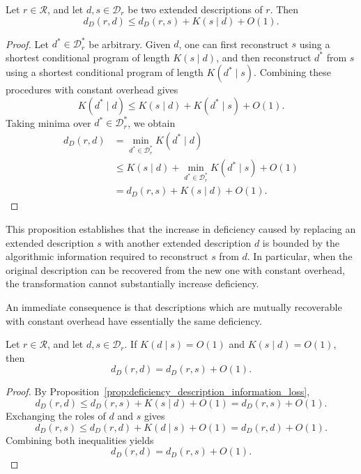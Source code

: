\begin{proposition}
\label{prop:deficiency_description_information_loss}
Let $r \in \mathcal R$, and let $d,s \in \mathcal D_r$ be two extended descriptions of $r$. Then
\[
d_D(r,d) \le d_D(r,s)+K(s\mid d)+O(1).
\]
\end{proposition}
\begin{proof}
Let $d^\ast \in \mathcal D_r^\ast$ be arbitrary. Given $d$, one can first reconstruct $s$ using a shortest conditional program of length $K(s\mid d)$, and then reconstruct $d^\ast$ from $s$ using a shortest conditional program of length $K(d^\ast\mid s)$. Combining these procedures with constant overhead gives
\[
K(d^\ast\mid d) \le K(s\mid d)+K(d^\ast\mid s)+O(1).
\]
Taking minima over $d^\ast \in \mathcal D_r^\ast$, we obtain
\[
\begin{aligned}
d_D(r,d)
& = \min_{d^\ast\in\mathcal D_r^\ast}K(d^\ast\mid d)\\
& \le K(s\mid d) + \min_{d^\ast\in\mathcal D_r^\ast}K(d^\ast\mid s) + O(1)\\
& = d_D(r,s)+K(s\mid d)+O(1).
\end{aligned}
\]
\end{proof}

This proposition establishes that the increase in deficiency caused by replacing an extended description $s$ with another extended description $d$ is bounded by the algorithmic information required to reconstruct $s$ from $d$. In particular, when the original description can be recovered from the new one with constant overhead, the transformation cannot substantially increase deficiency.

An immediate consequence is that descriptions which are mutually recoverable with constant overhead have essentially the same deficiency.

\begin{corollary}
\label{cor:deficiency_description_equivalent}
Let $r \in \mathcal R$, and let $d,s \in \mathcal D_r$. If $K(d\mid s)=O(1)$ and $K(s\mid d)=O(1)$,
then
\[
d_D(r,d)=d_D(r,s)+O(1).
\]
\end{corollary}
\begin{proof}
By Proposition~\ref{prop:deficiency_description_information_loss},
\[
d_D(r,d) \le d_D(r,s)+K(s\mid d)+O(1) = d_D(r,s)+O(1).
\]
Exchanging the roles of $d$ and $s$ gives
\[
d_D(r,s) \le d_D(r,d)+K(d\mid s)+O(1) = d_D(r,d)+O(1).
\]
Combining both inequalities yields
\[
d_D(r,d)=d_D(r,s)+O(1).
\]
\end{proof}

